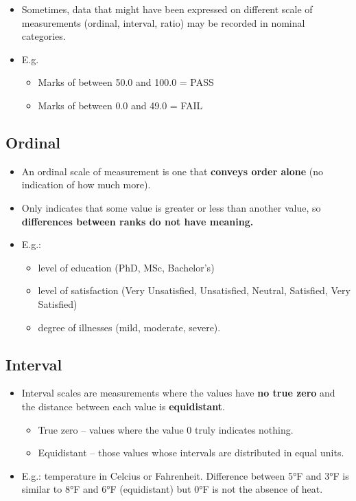 \documentclass[]{article}
\providecommand{\tightlist}{%
  \setlength{\itemsep}{0pt}\setlength{\parskip}{0pt}}
\begin{document}
\begin{itemize}
\tightlist
\item
  Sometimes, data that might have been expressed on different scale of
  measurements (ordinal, interval, ratio) may be recorded in nominal
  categories.
\item
  E.g.

  \begin{itemize}
  \tightlist
  \item
    Marks of between 50.0 and 100.0 = PASS
  \item
    Marks of between 0.0 and 49.0 = FAIL
  \end{itemize}
\end{itemize}

\hypertarget{ordinal}{%
\subsection{Ordinal}\label{ordinal}}

\begin{itemize}
\tightlist
\item
  An ordinal scale of measurement is one that {\textbf{conveys order
  alone}} (no indication of how much more).
\item
  Only indicates that some value is greater or less than another value,
  so {\textbf{differences between ranks do not have meaning.}}
\item
  E.g.:

  \begin{itemize}
  \tightlist
  \item
    level of education (PhD, MSc, Bachelor's)
  \item
    level of satisfaction (Very Unsatisfied, Unsatisfied, Neutral,
    Satisfied, Very Satisfied)
  \item
    degree of illnesses (mild, moderate, severe).
  \end{itemize}
\end{itemize}

\hypertarget{interval}{%
\subsection{Interval}\label{interval}}

\begin{itemize}
\tightlist
\item
  Interval scales are measurements where the values have {\textbf{no
  true zero}} and the distance between each value is
  {\textbf{equidistant}}.

  \begin{itemize}
  \tightlist
  \item
    True zero -- values where the value 0 truly indicates nothing.
  \item
    Equidistant -- those values whose intervals are distributed in equal
    units.
  \end{itemize}
\item
  E.g.: temperature in Celcius or Fahrenheit. Difference between 5°F and
  3°F is similar to 8°F and 6°F (equidistant) but 0°F is not the absence
  of heat.
\end{itemize}
\end{document}
